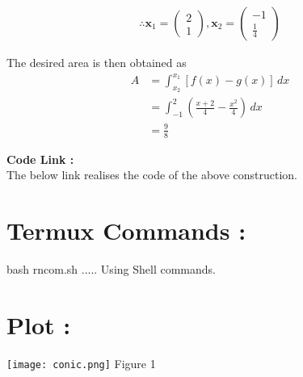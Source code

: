 \documentclass[10pt,a4paper]{report}
\newcommand{\myvec}[1]{\ensuremath{\begin{pmatrix}#1\end{pmatrix}}}
\let\vec\mathbf
\providecommand{\brak}[1]{\ensuremath{\left(#1\right)}}
\begin{document}
\begin{multicols}{2}
\begin{align}
\therefore \vec{x}_1=\myvec{2\\1} , \vec{x}_2=\myvec{-1\\ \frac{1}{4}}
\end{align}

The desired area is then obtained as
\begin{align}
	A&=\int_{x_2}^{x_1} [f(x)-g(x)] \,dx
	\\
	&=\int_{-1}^{2} \brak{\frac{x+2}{4}-\frac{x^2}{4}} \,dx
	\\
	& = \frac{9}{8} 
\end{align}
\iffalse

\raggedright \textbf{Code Link :}\\ \vspace{2mm}
The below link realises the code of the above construction.\\
\begin{center}
\end{center}


\section{Termux Commands :}
\centering bash rncom.sh ..... Using Shell commands.


\section{Plot :} 
\begin{center}
  \texttt{[image: conic.png]}
  Figure 1
  	\end{center}

 
\end{multicols}
\end{document}
